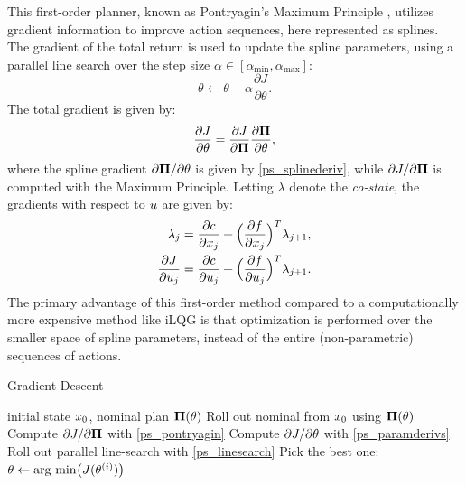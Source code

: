 This first-order planner, known as Pontryagin's Maximum Principle \cite{mangasarian1966sufficient}, utilizes gradient information to improve action sequences, here represented as splines. The gradient of the total return is used to update the spline parameters, using a parallel line search over the step size $\alpha \in [\alpha_{\textrm{min}}, \alpha_{\textrm{max}}]$:
\begin{equation} \label{ps_linesearch}
	\theta \leftarrow \theta - \alpha \frac{\partial J}{\partial \theta}.
\end{equation}
The total gradient is given by:
\begin{equation}\label{ps_paramderivs}
	\frac{\partial J}{\partial \theta} = \frac{\partial J}{\partial {\mathbf{\Pi}}} \frac{\partial {\mathbf{\Pi}}}{\partial \theta},
\end{equation}
where the spline gradient $\partial {\mathbf{\Pi}}/\partial \theta$ is given by \eqref{ps_splinederiv}, while $\partial J/\partial {\mathbf{\Pi}}$ is computed with the Maximum Principle. Letting $\lambda$ denote the \emph{co-state}, the gradients with respect to ${u}$ are given by:
\begin{subequations}\label{ps_pontryagin}
	\begin{align}
		\lambda_{j} &= \frac{\partial c}{\partial {x}_j} + \Bigl(\frac{\partial f}{\partial {x}_j}\Bigr)^T\lambda_{j+1}, \\
		\frac{\partial {J}}{\partial {u}_j} &= \frac{\partial c}{\partial {u}_j} + \Bigl(\frac{\partial f}{\partial {u}_j}\Bigr)^T\lambda_{j+1}.
	\end{align}
\end{subequations}
The primary advantage of this first-order method compared to a computationally more expensive method like iLQG is that optimization is performed over the smaller space of spline parameters, instead of the entire (non-parametric) sequences of actions.

\begin{algorithm}[H]
	\caption{Gradient Descent}\label{ps_gradient_descent_algorithm}
	\begin{algorithmic}[1]
		\Require initial state ${x}_0$, nominal plan ${\mathbf{\Pi}}(\theta)$
		\State Roll out nominal from ${x}_0$ using ${\mathbf{\Pi}}(\theta)$
		\State Compute $\partial {J}/\partial {\mathbf{\Pi}}$ with \eqref{ps_pontryagin}
		\State Compute $\partial {J}/\partial \theta$ with \eqref{ps_paramderivs}
		\State Roll out parallel line-search with \eqref{ps_linesearch}
		\State Pick the best one: $\theta \leftarrow \mbox{arg min} \bigl({J}(\theta^{(i)})\bigr)$
	\end{algorithmic}
\end{algorithm}

